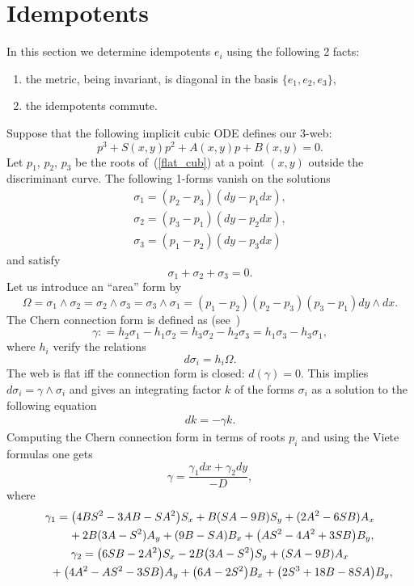 \documentclass[11pt]{article}
\begin{document}
\section{Idempotents}
In this section we determine idempotents $e_i$ using the following 2 facts:
\begin{enumerate}\itemsep=0pt
\item[1)] the metric, being invariant, is diagonal in the basis $\{e_1,e_2,e_3\}$,
\item[2)] the idempotents commute.
\end{enumerate}
Suppose that the following implicit cubic ODE def\/ines our $3$-web:
\begin{equation}\label{flat_cub}
p^3+S(x,y)p^2+A(x,y)p+B(x,y)=0.
\end{equation}
Let $p_1$, $p_2$, $p_3$ be the roots of~(\ref{flat_cub}) at a point
$(x,y)$ outside the discriminant curve. The following 1-forms vanish on the
solutions
\begin{gather}
\sigma_1=(p_2-p_3)(dy-p_1dx),\nonumber\\
\sigma_2=(p_3-p_1)(dy-p_2dx),\nonumber\\
\sigma_3=(p_1-p_2)(dy-p_3dx)\label{normalized forms}
\end{gather}
and satisfy
\[
\sigma_1+\sigma_2 + \sigma_3=0.
\]
Let us introduce an ``area'' form by
\[
\Omega =\sigma_1\wedge
\sigma_2=\sigma_2\wedge \sigma_3=\sigma_3\wedge
\sigma_1=(p_1-p_2)(p_2-p_3)(p_3-p_1)dy\wedge dx.
\]
 The Chern
connection form is def\/ined as (see~\cite{Be})
\[
\gamma:
=h_2\sigma_1-h_1\sigma_2=h_3\sigma_2-h_2\sigma_3=h_1\sigma_3-h_3\sigma_1,
\]
where $h_i$ verify the relations
\[
d\sigma_i=h_i\Omega.
\]
The web is f\/lat if\/f the connection form
is closed: $d(\gamma)=0$. This implies $d\sigma_i=\gamma \wedge \sigma_i$ and gives an integrating factor $k$ of the forms $\sigma_i$ as a solution to the following equation
\begin{gather*}%
dk=-\gamma k.
\end{gather*}
Computing the Chern connection form in terms of roots $p_i$ and using the Viete formulas one gets
\[
\gamma =\frac{\gamma_1dx+\gamma_2dy}{-D},
\]
where
\begin{gather*}
\gamma_1=\big(4BS^2-3AB-SA^2\big)S_x+B(SA-9B)S_y+(2A^2-6SB)A_x\nonumber\\
\hphantom{\gamma_1=}{}
+2B(3A-S^2)A_y+(9B-SA)B_x+\big(AS^2-4A^2+3SB\big)B_y,\nonumber\\
\gamma_2=\big(6SB-2A^2\big)S_x-2B\big(3A-S^2\big)S_y+(SA-9B)A_x\nonumber\\
\hphantom{\gamma_2=}{}
 + \big(4A^2-AS^2-3SB\big)A_y+\big(6A-2S^2\big)B_x+\big(2S^3+18B-8SA\big)B_y,%
\end{gather*}
\end{document}
